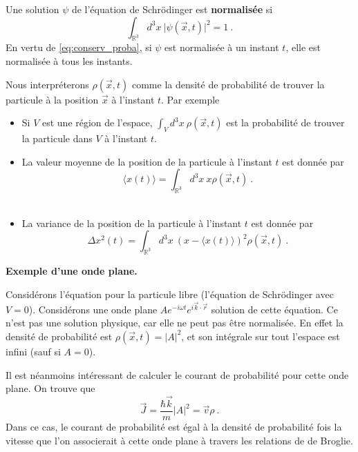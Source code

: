 \documentclass{book}
\begin{document}
Une solution $\psi$ de l'équation de Schrödinger est {\bf normalisée} si
\begin{equation}
\int_{\mathbb R^3} d^3 x \ \vert \psi(\vec x, t) \vert^2 =1\ .
\end{equation}
En vertu de \eqref{eq:conserv_proba}, si $\psi$ est normalisée à un instant $t$, elle est normalisée à tous les instants.

Nous interpréterons $\rho(\vec x, t) $ comme la densité de probabilité de trouver la particule à la position $\vec x$ à l'instant $t$. Par exemple 
\begin{itemize}
\item Si $V$ est une région de l'espace, $\int_V d^3 x\   \rho(\vec x, t) $ est la probabilité de trouver la particule dans $V$ à l'instant $t$.\\
\item 
La valeur moyenne de la position de la particule à l'instant $t$ est donnée par
$$\langle x(t) \rangle = \int_{\mathbb R^3} d^3 x \ x \rho(\vec x, t)\ .$$
\\
\item 
La variance de la position de la particule à l'instant $t$ est donnée par
$$\Delta x^2(t)  = \int_{\mathbb R^3} d^3 x \ (x -\langle x(t) \rangle)^2   \rho(\vec x, t) \ .$$
\end{itemize}



{\bf Exemple d'une onde plane.} {Considérons l'équation pour la particule libre (l'équation de Schrödinger avec $V=0$). 
Considérons une onde plane $A e^{-i\omega t} e ^{i \vec k \cdot \vec r}$ solution de cette équation. Ce n'est pas une solution physique, car elle ne peut pas être normalisée. En effet 
la densité de probabilité est $\rho(\vec x, t)= \vert A\vert^2$, et son intégrale sur tout l'espace est infini (sauf si $A=0$).

Il est néanmoins intéressant de calculer le courant de probabilité pour cette onde plane. On trouve que
 $$\vec J = \dfrac{\hbar \vec k }{m} \vert A\vert ^2 
 = \vec v \rho
\ .$$ 
Dans ce cas, le courant de probabilité est égal à la densité de probabilité fois la vitesse que l'on associerait à cette onde plane à travers les relations de de Broglie.
}
\end{document}
